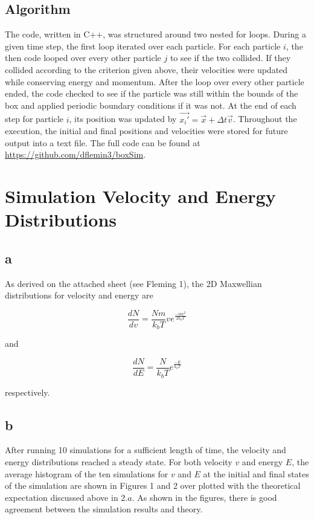\documentclass[12pt]{amsart}
\begin{document}
\subsection{Algorithm}

The code, written in C++, was structured around two nested for loops.  During a given time step, the first loop iterated over each particle.  For each particle $i$, the then code looped over every other particle $j$ to see if the two collided.  If they collided according to the criterion given above, their velocities were updated while conserving energy and momentum.  After the loop over every other particle ended, the code checked to see if the particle was still within the bounds of the box and applied periodic boundary conditions if it was not.  At the end of each step for particle $i$, its position was updated by $\vec{x_i'} = \vec{x} + \Delta t \vec{v}$.  Throughout the execution, the initial and final positions and velocities were stored for future output into a text file.  The full code can be found at \href{https://github.com/dflemin3/boxSim}{https://github.com/dflemin3/boxSim}.

\section{Simulation Velocity and Energy Distributions}

\subsection{a}

As derived on the attached sheet (see Fleming 1), the 2D Maxwellian distributions for velocity and energy are 

$$ \frac{dN}{dv} = \frac{N m}{k_b T} v e^{\frac{-m v^2}{2 k_b T}} $$

and

$$ \frac{dN}{dE} = \frac{N}{k_b T}  e^{\frac{-E}{k_b T}} $$

respectively.

\subsection{b}

After running 10 simulations for a sufficient length of time, the velocity and energy distributions reached a steady state.  For both velocity $v$ and energy $E$, the average histogram of the ten simulations for $v$ and $E$ at the initial and final states of the simulation are shown in Figures 1 and 2 over plotted with the theoretical expectation discussed above in $2.a$.  As shown in the figures, there is good agreement between the simulation results and theory.
\end{document}
